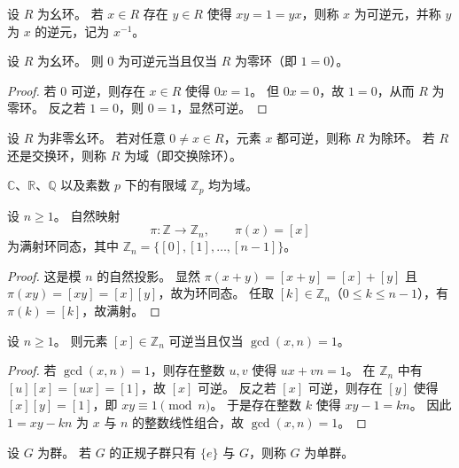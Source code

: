 \documentclass[lang=cn,a4paper,newtx]{elegantbook}
\begin{document}
\begin{definition}[可逆元]
设 $R$ 为幺环。
若 $x\in R$ 存在 $y\in R$ 使得 $xy=1=yx$，则称 $x$ 为可逆元，并称 $y$ 为 $x$ 的逆元，记为 $x^{-1}$。
\end{definition}

\begin{proposition}
设 $R$ 为幺环。
则 $0$ 为可逆元当且仅当 $R$ 为零环（即 $1=0$）。
\end{proposition}

\begin{proof}
若 $0$ 可逆，则存在 $x\in R$ 使得 $0x=1$。
但 $0x=0$，故 $1=0$，从而 $R$ 为零环。
反之若 $1=0$，则 $0=1$，显然可逆。
\end{proof}

\begin{definition}[除环与域]
设 $R$ 为非零幺环。
若对任意 $0\ne x\in R$，元素 $x$ 都可逆，则称 $R$ 为除环。
若 $R$ 还是交换环，则称 $R$ 为域（即交换除环）。
\end{definition}

\begin{example}
$\mathbb{C}$、$\mathbb{R}$、$\mathbb{Q}$ 以及素数 $p$ 下的有限域 $\mathbb{Z}_p$ 均为域。
\end{example}

\begin{proposition}
设 $n\ge 1$。
自然映射
\[
  \pi:\mathbb{Z}\to \mathbb{Z}_n,\qquad \pi(x)=[x]
\]
为满射环同态，其中 $\mathbb{Z}_n=\{[0],[1],\dots,[n-1]\}$。
\end{proposition}

\begin{proof}
这是模 $n$ 的自然投影。
显然 $\pi(x+y)=[x+y]=[x]+[y]$ 且 $\pi(xy)=[xy]=[x][y]$，故为环同态。
任取 $[k]\in \mathbb{Z}_n$（$0\le k\le n-1$），有 $\pi(k)=[k]$，故满射。
\end{proof}

\begin{proposition}
设 $n\ge 1$。
则元素 $[x]\in \mathbb{Z}_n$ 可逆当且仅当 $\gcd(x,n)=1$。
\end{proposition}

\begin{proof}
若 $\gcd(x,n)=1$，则存在整数 $u,v$ 使得 $ux+vn=1$。
在 $\mathbb{Z}_n$ 中有 $[u][x]=[ux]=[1]$，故 $[x]$ 可逆。
反之若 $[x]$ 可逆，则存在 $[y]$ 使得 $[x][y]=[1]$，即 $xy\equiv 1\pmod n$。
于是存在整数 $k$ 使得 $xy-1=kn$。
因此 $1=xy-kn$ 为 $x$ 与 $n$ 的整数线性组合，故 $\gcd(x,n)=1$。
\end{proof}

\begin{definition}[单群]
设 $G$ 为群。
若 $G$ 的正规子群只有 $\{e\}$ 与 $G$，则称 $G$ 为单群。
\end{definition}
\end{document}
